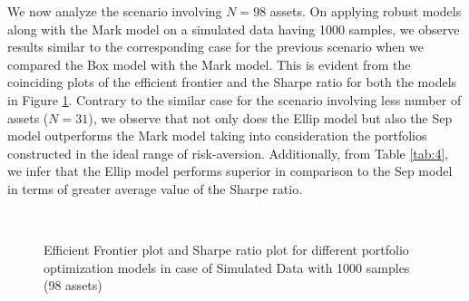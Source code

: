 We now analyze the scenario involving $N=98$ assets. On applying robust models along with the Mark model on a simulated data having 1000 samples, we observe results similar to the corresponding case for the previous scenario when we compared the Box model with the Mark model. This is evident from the coinciding plots of the efficient frontier and the Sharpe ratio for both the models in Figure \ref{fig:4}. Contrary to the similar case for the scenario involving less number of assets ($N=31$), we observe that not only does the Ellip model but also the Sep model outperforms the Mark model taking into consideration the portfolios constructed in the ideal range of risk-aversion. Additionally, from Table \ref{tab:4}, we infer that the Ellip model performs superior in comparison to the Sep model in terms of greater average value of the Sharpe ratio.
\begin{figure}[!h]
    
    
     \hfill
   \\
   \caption{Efficient Frontier plot and Sharpe ratio plot for different portfolio optimization models in case of Simulated Data with 1000 samples (98 assets)}
   \label{fig:4}
\end{figure}

